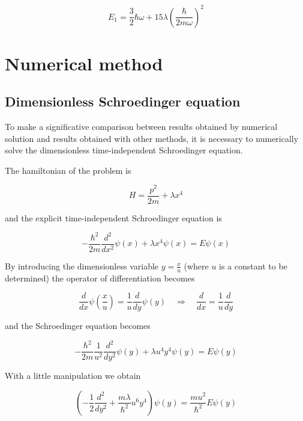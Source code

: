 \documentclass{article}
\begin{document}
\begin{equation}
E_1 = \frac{3}{2} \hbar \omega + 15 \lambda \left( \frac{\hbar}{2m\omega} \right)^2
\end{equation}

\section{Numerical method}

\subsection{Dimensionless Schroedinger equation}
To make a significative comparison between results obtained by numerical solution and results obtained with other methods, it is necessary to numerically solve the dimensionless time-independent Schroedinger equation.

The hamiltonian of the problem is

\begin{equation}
H = \frac{p^2}{2m} + \lambda x^4
\end{equation}

and the explicit time-independent Schroedinger equation is

\begin{equation}
-\frac{\hbar^2}{2m} \frac{d^2}{dx^2} \psi(x) + \lambda x^4 \psi(x) = E \psi(x)
\end{equation}

By introducing the dimensionless variable \( y = \frac{x}{u} \) (where \( u \) is a constant to be determined) the operator of differentiation becomes

\begin{equation}
\frac{d}{dx} \psi \left( \frac{x}{u} \right) = \frac{1}{u} \frac{d}{dy} \psi(y) \quad \Rightarrow \quad \frac{d}{dx} = \frac{1}{u} \frac{d}{dy}
\end{equation}

and the Schroedinger equation becomes

\begin{equation}
-\frac{\hbar^2}{2m} \frac{1}{u^2} \frac{d^2}{dy^2} \psi(y) + \lambda u^4 y^4 \psi(y) = E \psi(y)
\end{equation}

With a little manipulation we obtain

\begin{equation}
\left( -\frac{1}{2}\frac{d^2}{dy^2} + \frac{m\lambda}{\hbar^2} u^6 y^4 \right) \psi(y) = \frac{mu^2}{\hbar^2} E \psi(y)
\end{equation}
\end{document}
